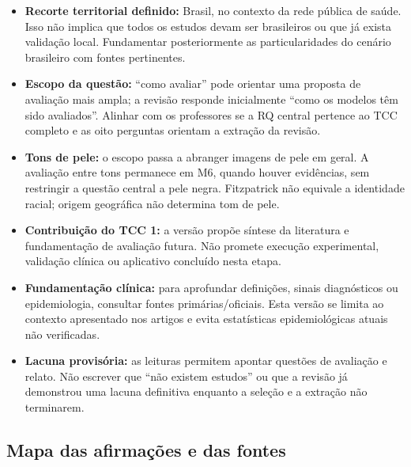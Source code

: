 \documentclass[
]{article}
\providecommand{\tightlist}{%
  \setlength{\itemsep}{0pt}\setlength{\parskip}{0pt}}
\begin{document}
\begin{itemize}
\tightlist
\item
  \textbf{Recorte territorial definido:} Brasil, no contexto da rede
  pública de saúde. Isso não implica que todos os estudos devam ser
  brasileiros ou que já exista validação local. Fundamentar
  posteriormente as particularidades do cenário brasileiro com fontes
  pertinentes.
\item
  \textbf{Escopo da questão:} ``como avaliar'' pode orientar uma
  proposta de avaliação mais ampla; a revisão responde inicialmente
  ``como os modelos têm sido avaliados''. Alinhar com os professores se
  a RQ central pertence ao TCC completo e as oito perguntas orientam a
  extração da revisão.
\item
  \textbf{Tons de pele:} o escopo passa a abranger imagens de pele em
  geral. A avaliação entre tons permanece em M6, quando houver
  evidências, sem restringir a questão central a pele negra. Fitzpatrick
  não equivale a identidade racial; origem geográfica não determina tom
  de pele.
\item
  \textbf{Contribuição do TCC 1:} a versão propõe síntese da literatura
  e fundamentação de avaliação futura. Não promete execução
  experimental, validação clínica ou aplicativo concluído nesta etapa.
\item
  \textbf{Fundamentação clínica:} para aprofundar definições, sinais
  diagnósticos ou epidemiologia, consultar fontes primárias/oficiais.
  Esta versão se limita ao contexto apresentado nos artigos e evita
  estatísticas epidemiológicas atuais não verificadas.
\item
  \textbf{Lacuna provisória:} as leituras permitem apontar questões de
  avaliação e relato. Não escrever que ``não existem estudos'' ou que a
  revisão já demonstrou uma lacuna definitiva enquanto a seleção e a
  extração não terminarem.
\end{itemize}

\subsection{Mapa das afirmações e das
fontes}\label{mapa-das-afirmauxe7uxf5es-e-das-fontes}
\end{document}
